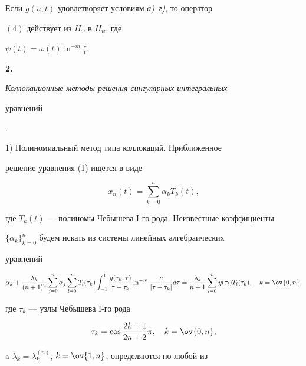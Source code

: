 \begin{thm}


Если $g(u,t)$ удовлетворяет условиям {\em а)--г)}, то оператор 


$(4)$ действует из $H_\omega$ в $H_\psi$, где 


$\psi(t)=\omega(t)\ln^{-m}\frac{c}{t}$.


\end{thm}





{\bf 2.} {\it Коллокационные методы решения сингулярных интегральных


уравнений}.





1) Полиномиальный метод типа коллокаций. Приближенное 


решение уравнения (1) ищется в виде


\begin{equation}


x_n(t)=\sum^n_{k=0}\alpha_k T_k(t),


\end{equation}


где $T_k(t)$ --- полиномы Чебышева I-го рода. Неизвестные коэффициенты 


$\{\alpha_k\}^n_{k=0}$ будем искать из системы линейных алгебраических 


уравнений


\begin{equation}


\alpha_k+\frac{\lambda_k}{(n+1)^2}\sum^n_{j=0}\alpha_j


\sum^n_{l=0}T_l(\tau_k)\int^1_{-1}


\frac{g(\tau_k,\tau)}{\tau-\tau_k}\ln^{-m}


\frac{c}{|\tau-\tau_k|}d\tau=\frac{\lambda_k}{n+1}


\sum^n_{l=0}y(\tau_l)T_l(\tau_k),\quad k=\ov{0,n},


\end{equation}


где $\tau_k$ --- узлы Чебышева I-го рода


\begin{equation}


\tau_k=\cos\frac{2k+1}{2n+2}\pi,\quad k=\ov{0,n},


\end{equation}


a $\lambda_k=\lambda^{(n)}_k$, $k=\ov{1,n}$, определяются по любой из 


